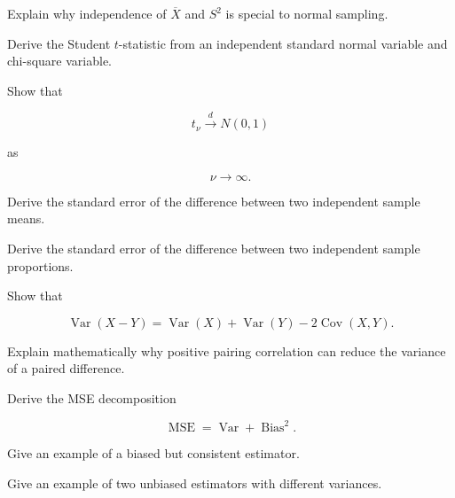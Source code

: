 \begin{exercise}[3]
Explain why independence of \(\overline{X}\) and \(S^2\) is special to
normal sampling.
\end{exercise}

\begin{exercise}[3]
Derive the Student \(t\)-statistic from an independent standard normal
variable and chi-square variable.
\end{exercise}

\begin{exercise}[3]
Show that

\[
t_\nu
\xrightarrow{d}
N(0,1)
\]

as

\[
\nu\to\infty.
\]
\end{exercise}

\begin{exercise}[3]
Derive the standard error of the difference between two independent
sample means.
\end{exercise}

\begin{exercise}[3]
Derive the standard error of the difference between two independent
sample proportions.
\end{exercise}

\begin{exercise}[3]
Show that

\[
\operatorname{Var}(X-Y)
=
\operatorname{Var}(X)
+
\operatorname{Var}(Y)
-
2\operatorname{Cov}(X,Y).
\]
\end{exercise}

\begin{exercise}[3]
Explain mathematically why positive pairing correlation can reduce the
variance of a paired difference.
\end{exercise}

\begin{exercise}[3]
Derive the MSE decomposition

\[
\operatorname{MSE}
=
\operatorname{Var}
+
\operatorname{Bias}^2.
\]
\end{exercise}

\begin{exercise}[3]
Give an example of a biased but consistent estimator.
\end{exercise}

\begin{exercise}[3]
Give an example of two unbiased estimators with different variances.
\end{exercise}

